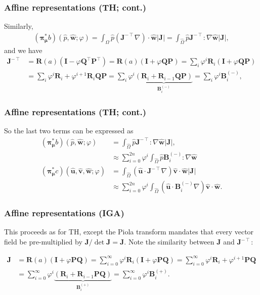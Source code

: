 \begin{frame}
  \frametitle{Affine representations (TH; cont.)}

  Similarly,
  \begin{align*}
    ({\bm\pi}^*_{\bm\mu}b)(
    \hat{p},
    \hat{\bm w};
    \varphi
    ) =
    \int_{\hat{\Omega}} \hat{p} (\bm J^{-\intercal} \nabla) \cdot \hat{\bm w} |\bm J|
    = \int_{\hat{\Omega}} \hat{p} \bm J^{-\intercal} : \nabla \hat{\bm w} |\bm J|,
  \end{align*}
  and we have
  \begin{align*}
    \bm J^{-\intercal}
    &= \bm R(a) (\bm I - \varphi \bm Q^\intercal \bm P^\intercal)
      = \bm R(a) (\bm I + \varphi \bm Q \bm P)
      = \sum_{i}
      \varphi^i \bm R_i
      (\bm I + \varphi \bm Q \bm P) \\
    &= \sum_{i}
      \varphi^i \bm R_i
      + \varphi^{i+1} \bm R_i \bm Q \bm P
      = \sum_{i}
      \varphi^i \underbrace{\left(
      \bm R_i + \bm R_{i-1} \bm Q \bm P
      \right)}_{\bm B^{(-)}_i}
      = \sum_{i} \varphi^i \bm B^{(-)}_i,
  \end{align*}
\end{frame}

\begin{frame}
  \frametitle{Affine representations (TH; cont.)}

  So the last two terms can be expressed as
  \begin{align*}
    ({\bm\pi}^*_{\bm\mu}b)(
    \hat{p},
    \hat{\bm w};
    \varphi
    )
    &= \int_{\hat{\Omega}} \hat{p} \bm J^{-\intercal} : \nabla \hat{\bm w} |\bm J|, \\
    &\approx \sum_{i=0}^{2n} \varphi^i
    \int_{\hat{\Omega}} \hat{p} \bm B^{(-)}_i : \nabla \hat{\bm w} \\
    ({\bm\pi}^*_{\bm\mu}c)(
    \hat{\bm u},
    \hat{\bm v},
    \hat{\bm w};
    \varphi
    )
    &= \int_{\hat{\Omega}} (\hat{\bm u} \cdot \bm J^{-\intercal}\nabla) \hat{\bm v} \cdot \hat{\bm w} |\bm J| \\
    &\approx \sum_{i=0}^{2n} \varphi^i \int_{\hat{\Omega}}
    (\hat{\bm u} \cdot \bm B^{(-)}_i \nabla) \hat{\bm v} \cdot \hat{\bm w}.
  \end{align*}
\end{frame}

\begin{frame}
  \frametitle{Affine representations (IGA)}

  This proceeds as for TH, except the Piola transform mandates that
  every vector field be pre-multiplied by $\bm J/\det \bm J = \bm J$. Note
  the similarity between $\bm J$ and $\bm J^{-\intercal}$:

  \begin{align*}
    \nonumber
    \bm J
    &= \bm R(a) (\bm I + \varphi \bm P \bm Q)
      = \sum_{i=0}^\infty \varphi^i \bm R_i (\bm I + \varphi \bm P \bm Q)
      = \sum_{i=0}^\infty \varphi^i \bm R_i + \varphi^{i+1} \bm P \bm Q \\
    &= \sum_{i=0}^\infty
      \varphi^i \underbrace{\left(
      \bm R_i + \bm R_{i-1} \bm P \bm Q
      \right)}_{\bm B^{(+)}_i} = \sum_{i=0}^\infty \varphi^i \bm B^{(+)}_i.
  \end{align*}
\end{frame}

